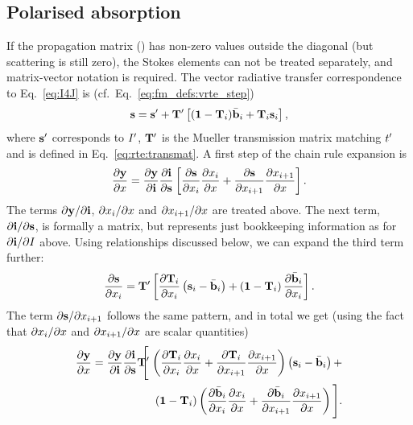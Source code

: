 \subsection{Polarised absorption}
\label{sec:wfuns:atmvars:pol}
%
If the propagation matrix (\ExtMat) has non-zero values outside the diagonal
(but scattering is still zero), the Stokes elements can not be treated
separately, and matrix-vector notation is required. The vector radiative
transfer correspondence to Eq.~\ref{eq:I4J} is
(cf.~Eq.~\ref{eq:fm_defs:vrte_step})
\begin{equation}
  \label{eq:s4J}
  {\bf s} = {\bf s}' + \mathbf{T}' \left[ (\mathbf{1}-\mathbf{T}_{i})\bar{{\bf b}}_i +
      \mathbf{T}_{i} {\bf s}_{i} \right],
\end{equation}
where ${\bf s}'$ corresponds to $I'$, $\mathbf{T}'$ is the Mueller
transmission matrix matching $t'$ and  is defined in
Eq.~\ref{eq:rte:transmat}. A first step of the chain rule expansion is
\begin{equation}
  \frac{\partial\mathbf{y}}{\partial x} =  
  \frac{\partial\mathbf{y}}{\partial\mathbf{i}}
  \frac{\partial\mathbf{i}}{\partial{\bf s}} 
  \left[ \frac{\partial{\bf s}}{\partial x_{i}}
         \frac{\partial x_{i}}{\partial x} +
         \frac{\partial{\bf s}}{\partial x_{i+1}}
         \frac{\partial x_{i+1}}{\partial x} 
  \right].
\end{equation}
The terms $\partial\mathbf{y}/\partial\mathbf{i}$, $\partial x_{i}/\partial x$
and $\partial x_{i+1}/\partial x$ are treated above. The next term,
$\partial\mathbf{i}/\partial{\bf s}$, is formally a matrix, but represents just
bookkeeping information as for $\partial\mathbf{i}/\partial I$ above. Using
relationships discussed below, we can expand the third term further:
\begin{equation}
  \frac{\partial{\bf s}}{\partial x_{i}} = \mathbf{T}'
  \left[
    \frac{\partial\mathbf{T}_{i}}{\partial x_{i}}
      \left( {\bf s}_{i}-\bar{{\bf b}}_i \right) +
    \left( \mathbf{1}-\mathbf{T}_{i} \right) 
      \frac{\partial\bar{{\bf b}}_i}{\partial x_{i}}
  \right].
\end{equation}
The term $\partial{\bf s}/\partial x_{i+1}$ follows the same pattern, and in
total we get (using the fact that $\partial x_{i}/\partial x$ and
$\partial x_{i+1}/\partial x$ are scalar quantities)
\begin{eqnarray}
  \frac{\PartD\MsrVct}{\PartD\SttElm} =  
  \frac{\PartD\MsrVct}{\PartD\MpiVct}
  \frac{\PartD\MpiVct}{\PartD\StoVec} \TrnMat'
  \!\!\!\!&\Bigg[&\!\!\!\!
    \left( 
      \frac{\PartD\aTrnMat{i}}{\PartD\aSttElm{i}}
      \frac{\PartD\aSttElm{i}}{\PartD\SttElm} +
      \frac{\PartD\aTrnMat{i}}{\PartD\aSttElm{i+1}}
      \frac{\PartD\aSttElm{i+1}}{\PartD\SttElm}
    \right)
    \left( \aStoVec{i}-\bar{\EmsVec}_i \right) + \nonumber\\ && \!\!\!
    \left( \IdnMtr-\aTrnMat{i} \right) 
    \left(
      \frac{\PartD\bar{\EmsVec}_i}{\PartD\aSttElm{i}} 
      \frac{\PartD\aSttElm{i}}{\PartD\SttElm} +
      \frac{\PartD\bar{\EmsVec}_i}{\PartD\aSttElm{i+1}} 
      \frac{\PartD\aSttElm{i+1}}{\PartD\SttElm}
    \right)
  \Bigg].
  \label{eq:chainrule2}
\end{eqnarray}
